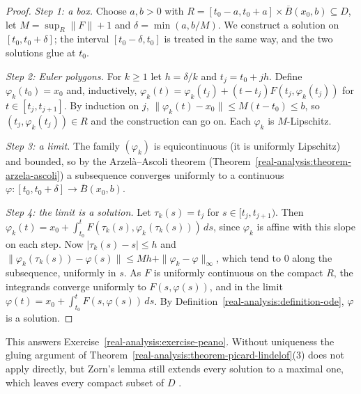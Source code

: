 \begin{proof}
\emph{Step 1: a box.} Choose $a, b > 0$ with $R = [t_0 - a, t_0 + a] \times \overline{B}(x_0, b) \subseteq D$, let $M = \sup_R\|F\| + 1$ and $\delta = \min(a, b/M)$. We construct a solution on $[t_0, t_0 + \delta]$; the interval
$[t_0 - \delta, t_0]$ is treated in the same way, and the two solutions glue at $t_0$.

\emph{Step 2: Euler polygons.} For $k \geq 1$ let $h = \delta/k$ and $t_j = t_0 + jh$. Define $\varphi_k(t_0) = x_0$ and, inductively,
$\varphi_k(t) = \varphi_k(t_j) + (t - t_j)F(t_j, \varphi_k(t_j))$ for $t \in [t_j, t_{j+1}]$. By induction on $j$, $\|\varphi_k(t) - x_0\| \leq M(t - t_0) \leq b$, so $(t_j, \varphi_k(t_j)) \in R$ and the construction can go on. Each
$\varphi_k$ is $M$-Lipschitz.

\emph{Step 3: a limit.} The family $(\varphi_k)$ is equicontinuous (it is uniformly Lipschitz) and bounded, so by the Arzel\`a--Ascoli theorem (Theorem~\ref{real-analysis:theorem-arzela-ascoli}) a subsequence converges
uniformly to a continuous $\varphi \colon [t_0, t_0 + \delta] \to \overline{B}(x_0, b)$.

\emph{Step 4: the limit is a solution.} Let $\tau_k(s) = t_j$ for $s \in [t_j, t_{j+1})$. Then $\varphi_k(t) = x_0 + \int_{t_0}^tF(\tau_k(s), \varphi_k(\tau_k(s)))\,ds$, since $\varphi_k$ is affine with this slope on each step. Now
$|\tau_k(s) - s| \leq h$ and $\|\varphi_k(\tau_k(s)) - \varphi(s)\| \leq Mh + \|\varphi_k - \varphi\|_\infty$, which tend to $0$ along the subsequence, uniformly in $s$. As $F$ is uniformly continuous on the compact $R$, the integrands
converge uniformly to $F(s, \varphi(s))$, and in the limit $\varphi(t) = x_0 + \int_{t_0}^tF(s, \varphi(s))\,ds$. By Definition~\ref{real-analysis:definition-ode}, $\varphi$ is a solution.
\end{proof}

This answers Exercise~\ref{real-analysis:exercise-peano}. Without uniqueness the gluing argument of Theorem~\ref{real-analysis:theorem-picard-lindelof}(3) does not apply directly, but Zorn's lemma still extends every
solution to a maximal one, which leaves every compact subset of $D$ \cite[Chapter II]{hartman-ode}.


